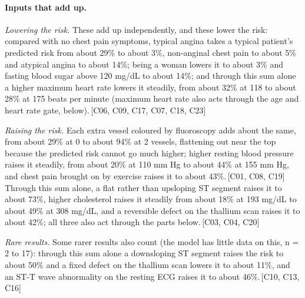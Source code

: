 \documentclass[a4paper,10pt]{article}
\newif\ifreviewmarks
\newcommand{\reviewrule}{\noindent{\color{BrickRed}\rule{\linewidth}{0.8pt}}}
\newenvironment{drafted}[1][]{%
  \ifreviewmarks\par\addvspace{\medskipamount}\reviewrule\par\nopagebreak
  \noindent{\color{BrickRed}\sffamily\footnotesize\textbf{Thesis Draft}\quad #1\hfill review}\par\nopagebreak\smallskip\fi}{%
  \ifreviewmarks\par\smallskip\noindent{\color{BrickRed}\sffamily\footnotesize end of thesis draft}\par\nopagebreak\reviewrule\par\medskip\fi}
\begin{document}
\begin{drafted}[plain-language layer: heart-s2-c1]
\paragraph{Inputs that add up.} \par\noindent\textit{Lowering the risk.}  These add up independently, and these lower the risk: compared with no chest pain symptoms, typical angina takes a typical patient's predicted risk from about 29\% to about 3\%, non-anginal chest pain to about 5\% and atypical angina to about 14\%; being a woman lowers it to about 3\% and fasting blood sugar above 120 mg/dL to about 14\%; and through this sum alone a higher maximum heart rate lowers it steadily, from about 32\% at 118 to about 28\% at 175 beats per minute (maximum heart rate also acts through the age and heart rate gate, below).\,{\scriptsize\textcolor{NavyBlue}{[C06, C09, C17, C07, C18, C23]}} \par\noindent\textit{Raising the risk.}  Each extra vessel coloured by fluoroscopy adds about the same, from about 29\% at 0 to about 94\% at 2 vessels, flattening out near the top because the predicted risk cannot go much higher; higher resting blood pressure raises it steadily, from about 20\% at 110 mm Hg to about 44\% at 155 mm Hg, and chest pain brought on by exercise raises it to about 43\%.\,{\scriptsize\textcolor{NavyBlue}{[C01, C08, C19]}} Through this sum alone, a flat rather than upsloping ST segment raises it to about 73\%, higher cholesterol raises it steadily from about 18\% at 193 mg/dL to about 49\% at 308 mg/dL, and a reversible defect on the thallium scan raises it to about 42\%; all three also act through the parts below.\,{\scriptsize\textcolor{NavyBlue}{[C03, C04, C20]}} \par\noindent\textit{Rare results.}  Some rarer results also count (the model has little data on this, n = 2 to 17): through this sum alone a downsloping ST segment raises the risk to about 50\% and a fixed defect on the thallium scan lowers it to about 11\%, and an ST-T wave abnormality on the resting ECG raises it to about 46\%.\,{\scriptsize\textcolor{NavyBlue}{[C10, C13, C16]}}

\end{drafted}
\end{document}
